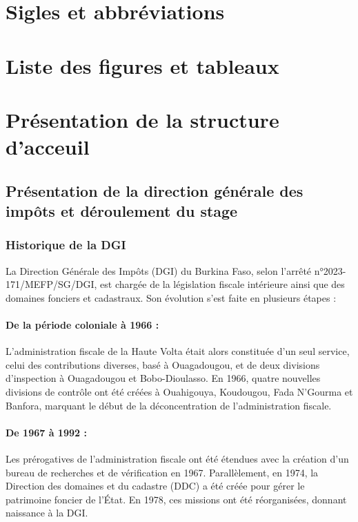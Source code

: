 \documentclass[a4paper,12pt]{report}
\begin{document}
\chapter*{Sigles et abbréviations}

\chapter*{Liste des figures et tableaux}
\listoffigures
\listoftables

\chapter{Présentation de la structure d'acceuil}

\setcounter{section}{0}
\section*{Présentation de la direction générale des impôts et déroulement du stage}

\subsection*{Historique de la DGI}

La Direction Générale des Impôts (DGI) du Burkina Faso, selon l’arrêté n°2023-171/MEFP/SG/DGI, est chargée de la législation fiscale intérieure ainsi que des domaines fonciers et cadastraux. Son évolution s'est faite en plusieurs étapes :

\subsubsection*{De la période coloniale à 1966 :}  
L’administration fiscale de la Haute Volta était alors constituée d’un seul service, celui des contributions diverses, basé à Ouagadougou, et de deux divisions d’inspection à Ouagadougou et Bobo-Dioulasso. En 1966, quatre nouvelles divisions de contrôle ont été créées à Ouahigouya, Koudougou, Fada N’Gourma et Banfora, marquant le début de la déconcentration de l’administration fiscale.

\subsubsection*{De 1967 à 1992 :}  
Les prérogatives de l’administration fiscale ont été étendues avec la création d’un bureau de recherches et de vérification en 1967. Parallèlement, en 1974, la Direction des domaines et du cadastre (DDC) a été créée pour gérer le patrimoine foncier de l’État. En 1978, ces missions ont été réorganisées, donnant naissance à la DGI.
\end{document}

